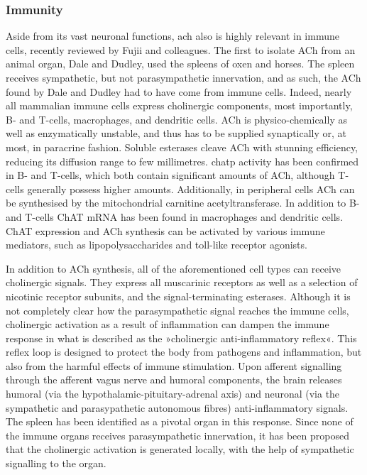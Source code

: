 \subsubsection{Immunity}
Aside from its vast neuronal functions, \ac{ach} also is highly relevant in immune cells, recently reviewed by Fujii and colleagues\cite{Fujii2017}. The first to isolate ACh from an animal organ, Dale and Dudley\cite{Dale1929}, used the spleens of oxen and horses. The spleen receives sympathetic, but not parasympathetic innervation, and as such, the ACh found by Dale and Dudley had to have come from immune cells. Indeed, nearly all mammalian immune cells express cholinergic components, most importantly, B- and T-cells, macrophages, and dendritic cells. ACh is physico-chemically as well as enzymatically unstable, and thus has to be supplied synaptically or, at most, in paracrine fashion. Soluble esterases cleave ACh with stunning efficiency, reducing its diffusion range to few millimetres. \Ac{chatp} activity has been confirmed in B- and T-cells, which both contain significant amounts of ACh, although T-cells generally possess higher amounts. Additionally, in peripheral cells ACh can be synthesised by the mitochondrial carnitine acetyltransferase. In addition to B- and T-cells ChAT mRNA has been found in macrophages and dendritic cells. ChAT expression and ACh synthesis can be activated by various immune mediators, such as lipopolysaccharides and toll-like receptor agonists.

In addition to ACh synthesis, all of the aforementioned cell types can receive cholinergic signals. They express all muscarinic receptors as well as a selection of nicotinic receptor subunits, and the signal-terminating esterases. Although it is not completely clear how the parasympathetic signal reaches the immune cells, cholinergic activation as a result of inflammation can dampen the immune response in what is described as the »cholinergic anti-inflammatory reflex«\cite{Pavlov2017}. This reflex loop is designed to protect the body from pathogens and inflammation, but also from the harmful effects of immune stimulation. Upon afferent signalling through the afferent vagus nerve and humoral components, the brain releases humoral (via the hypothalamic-pituitary-adrenal axis) and neuronal (via the sympathetic and parasypathetic autonomous fibres) anti-inflammatory signals. The spleen has been identified as a pivotal organ in this response. Since none of the immune organs receives parasympathetic innervation, it has been proposed that the cholinergic activation is generated locally, with the help of sympathetic signalling to the organ.

